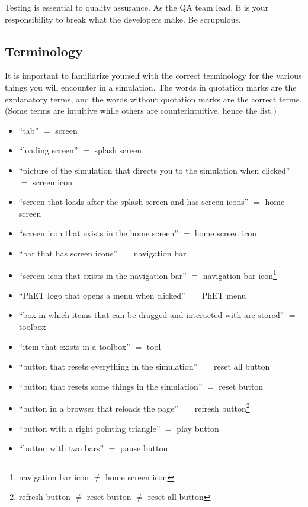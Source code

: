 \documentclass[titlepage]{article}
\begin{document}
Testing is essential to quality assurance. As the QA team lead, it is your responsibility to break what the developers make. Be scrupulous.
	
	\subsection{Terminology}

It is important to familiarize yourself with the correct terminology for the various things you will encounter in a simulation. The words in quotation marks are the explanatory terms, and the words without quotation marks are the correct terms. (Some terms are intuitive while others are counterintuitive, hence the list.)

		\begin{itemize}
			\item ``tab'' $ = $ screen
			\item ``loading screen'' $ = $ splash screen
			\item ``picture of the simulation that directs you to the simulation when clicked'' $ = $ screen icon
			\item ``screen that loads after the splash screen and has screen icons'' $ = $ home screen
			\item ``screen icon that exists in the home screen'' $ = $ home screen icon
			\item ``bar that has screen icons'' $ = $ navigation bar
			\item ``screen icon that exists in the navigation bar'' $ = $ navigation bar icon\footnote{navigation bar icon $ \neq $ home screen icon}
			\item ``PhET logo that opens a menu when clicked'' $ = $ PhET menu
			\item ``box in which items that can be dragged and interacted with are stored'' $ = $ toolbox
			\item ``item that exists in a toolbox'' $ = $ tool
			\item ``button that resets everything in the simulation'' $ = $ reset all button
			\item ``button that resets some things in the simulation'' $ = $ reset button
			\item ``button in a browser that reloads the page'' $ = $ refresh button\footnote{refresh button $ \neq $ reset button $ \neq $ reset all button}
			\item ``button with a right pointing triangle'' $ = $ play button
			\item ``button with two bars'' $ = $ pause button

\end{itemize}
\end{document}
